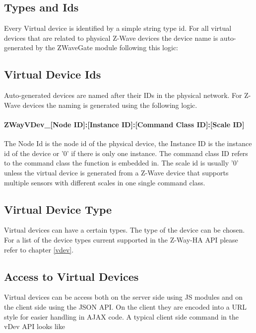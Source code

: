 \subsection{Types and Ids}

Every Virtual device is identified by a simple string type id. For all virtual devices 
that are related to physical Z-Wave devices the device name is auto-generated by the 
ZWaveGate module following this logic:


\subsection{Virtual Device Ids}

Auto-generated devices are named after their IDs in the physical network. For Z-Wave 
devices the naming is generated using the following logic.

\paragraph{ZWayVDev\_[Node ID]:[Instance ID]:[Command Class ID]:[Scale ID]}

The Node Id is the node id of the physical device, the Instance ID is the instance id 
of the device  or '0' if there is only one instance. The command class ID refers to the 
command class the function is embedded in. The scale id is usually '0' unless the virtual
device is generated from a Z-Wave device that supports multiple sensors with different 
scales in one single command class.

\subsection{Virtual Device Type}

Virtual devices can have a certain types. The type of the device can be chosen. For a list 
of the device types current supported in the Z-Way-HA API please refer to chapter
\ref{vdev}.
 
\subsection{Access to Virtual Devices}

Virtual devices can be access both on the server side using JS modules and on the client 
side using the JSON API. On the client they are encoded into a URL style for easier 
handling  in AJAX code. A typical client side command in the vDev API looks like

